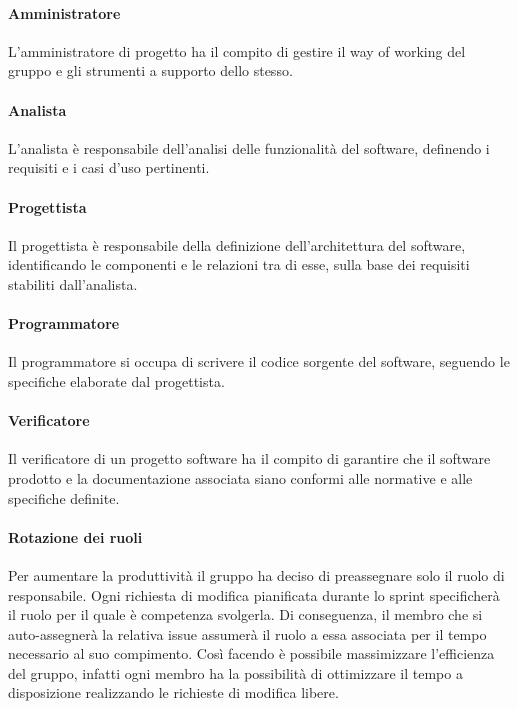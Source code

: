 \paragraph{Amministratore}
L'amministratore di progetto ha il compito di gestire il way of working del gruppo e gli strumenti a supporto dello stesso.

\paragraph{Analista}
L'analista è responsabile dell’analisi delle funzionalità del software, definendo i requisiti e i casi d’uso pertinenti.

\paragraph{Progettista}
Il progettista è responsabile della definizione dell’architettura del software, identificando le componenti e le relazioni tra di esse, sulla base dei requisiti stabiliti dall’analista. 

\paragraph{Programmatore}
Il programmatore si occupa di scrivere il codice sorgente del software, seguendo le specifiche elaborate dal progettista.

\paragraph{Verificatore}
Il verificatore di un progetto software ha il compito di garantire che il software prodotto e la documentazione associata siano conformi alle normative e alle specifiche definite. 

\paragraph{Rotazione dei ruoli}
Per aumentare la produttività il gruppo ha deciso di preassegnare solo il ruolo di responsabile.
Ogni richiesta di modifica pianificata durante lo sprint specificherà il ruolo per il quale è competenza svolgerla.
Di conseguenza, il membro che si auto-assegnerà la relativa issue assumerà il ruolo a essa associata per il tempo necessario al suo compimento.
Così facendo è possibile massimizzare l'efficienza del gruppo, infatti ogni membro ha la possibilità di ottimizzare il tempo a disposizione realizzando le richieste di modifica libere.


